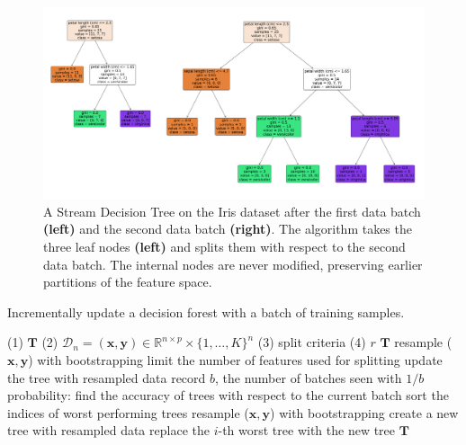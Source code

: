 \begin{figure}[!htb]
\centering
\includegraphics[width=\textwidth]{iris}
  \caption{A Stream Decision Tree on the Iris dataset after the first data batch \textbf{(left)} and the second data batch \textbf{(right)}. The algorithm takes the three leaf nodes \textbf{(left)} and splits them with respect to the second data batch. The internal nodes are never modified, preserving earlier partitions of the feature space.
  }
\label{fig:iris}
\end{figure}

\begin{algorithm}[!htb]
\caption{Incrementally update a decision forest with a batch of training samples.}
\label{alg:sdf}
\begin{algorithmic}[1]
\Require
\Statex (1) $\mathbf{T}$ 
\Statex (2) $\mathcal{D}_n = (\mathbf{x},\mathbf{y}) \in \mathbb{R}^{n \times p} \times \{1,\ldots, K\}^n$ 
\Statex (3) split criteria 
\Statex (4) $r$ 
\Ensure
$\mathbf{T}$ 
\State resample ($\mathbf{x},\mathbf{y}$) with bootstrapping
\State limit the number of features used for splitting
\State update the tree with resampled data 
\EndFor
\State record $b$, the number of batches seen
with $1/b$ probability:
\State find the accuracy of trees with respect to the current batch
\State sort the indices of worst performing trees
\State resample ($\mathbf{x},\mathbf{y}$) with bootstrapping
\State create a new tree with resampled data
\State replace the $i$-th worst tree with the new tree 
\EndFor
\EndIf
\State \Return $\mathbf{T}$
\EndFunction
\end{algorithmic}
\end{algorithm}

